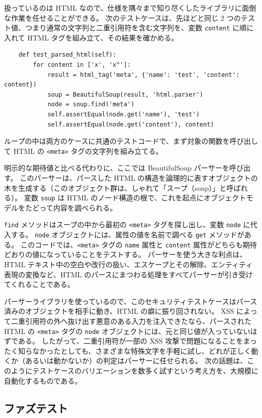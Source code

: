 \documentclass[uplatex]{jsarticle}
\begin{document}
扱っているのは HTML なので、仕様を隅々まで知り尽くしたライブラリに面倒な作業を任せることができる。
次のテストケースは、先ほどと同じ 2 つのテスト値、つまり通常の文字列と二重引用符を含む文字列を、変数 \texttt{content} に順に入れて HTML タグを組み立て、その結果を確かめる。

\begin{verbatim}
    def test_parsed_html(self):
        for content in ['x', 'x"']:
            result = html_tag('meta', {'name': 'test', 'content': content})
            soup = BeautifulSoup(result, 'html.parser')
            node = soup.find('meta')
            self.assertEqual(node.get('name'), 'test')
            self.assertEqual(node.get('content'), content)
\end{verbatim}

ループの中は両方のケースに共通のテストコードで、まず対象の関数を呼び出して HTML の \texttt{<meta>} タグの文字列を組み立てる。

明示的な期待値と比べる代わりに、ここでは BeautifulSoup パーサーを呼び出す。
このパーサーは、パースした HTML の構造を論理的に表すオブジェクトの木を生成する（このオブジェクト群は、しゃれて「スープ（soup）」と呼ばれる）。
変数 \texttt{soup} は HTML のノード構造の根で、これを起点にオブジェクトモデルをたどって内容を調べられる。

\texttt{find} メソッドはスープの中から最初の \texttt{<meta>} タグを探し出し、変数 \texttt{node} に代入する。
\texttt{node} オブジェクトには、属性の値を名前で調べる \texttt{get} メソッドがある。
このコードでは、\texttt{<meta>} タグの \texttt{name} 属性と \texttt{content} 属性がどちらも期待どおりの値になっていることをテストする。
パーサーを使う大きな利点は、HTML テキスト中の空白や改行の扱い、エスケープとその解除、エンティティ表現の変換など、HTML のパースにまつわる処理をすべてパーサーが引き受けてくれることである。

パーサーライブラリを使っているので、このセキュリティテストケースはパース済みのオブジェクトを相手に動き、HTML の癖に振り回されない。
XSS によって二重引用符の外へ抜け出す悪意のある入力を注入できたなら、パースされた HTML の \texttt{<meta>} タグの \texttt{node} オブジェクトには、元と同じ値が入っていないはずである。
したがって、二重引用符が一部の XSS 攻撃で問題になることをまったく知らなかったとしても、さまざまな特殊文字を手軽に試し、どれが正しく動くか（あるいは動かないか）の判定はパーサーに任せられる。
次の話題は、このようにテストケースのバリエーションを数多く試すという考え方を、大規模に自動化するものである。

\subsection{ファズテスト}
\end{document}

